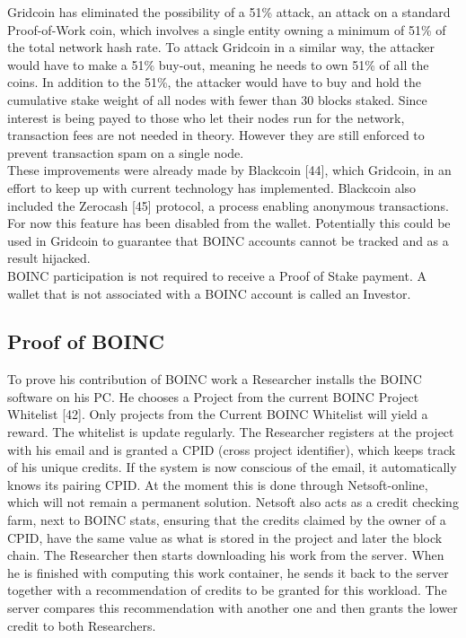 Gridcoin has eliminated the possibility of a 51\% attack, an attack on a standard Proof-of-Work coin, which involves a single entity owning a minimum of 51\% of the total network hash rate. To attack Gridcoin in a similar way, the attacker would have to make a 51\% buy-out, meaning he needs to own 51\% of all the coins. In addition to the 51\%, the attacker would have to buy and hold the cumulative stake weight of all nodes with fewer than 30 blocks staked. Since interest is being payed to those who let their nodes run for the network, transaction fees are not needed in theory. However they are still enforced to prevent transaction spam on a single node.\\

These improvements were already made by Blackcoin [44], which Gridcoin, in an effort to keep up with current technology has implemented. Blackcoin also included the Zerocash [45] protocol, a process enabling anonymous transactions. For now this feature has been disabled from the wallet. Potentially this could be used in Gridcoin to guarantee that BOINC accounts cannot be tracked and as a result hijacked.\\

BOINC participation is not required to receive a Proof of Stake payment. A wallet that is not associated with a BOINC account is called an Investor.

\subsection{Proof of BOINC}

To prove his contribution of BOINC work a Researcher installs the BOINC software on his PC. He chooses a Project from the current BOINC Project Whitelist [42]. Only projects from the Current BOINC Whitelist will yield a reward. The whitelist is update regularly. The Researcher registers at the project with his email and is granted a CPID (cross project identifier), which keeps track of his unique credits. If the system is now conscious of the email, it automatically knows its pairing CPID. At the moment this is done through Netsoft-online, which will not remain a permanent solution. Netsoft also acts as a credit checking farm, next to BOINC stats, ensuring that the credits claimed by the owner of a CPID, have the same value as what is stored in the project and later the block chain. The Researcher then starts downloading his work from the server. When he is finished with computing this work container, he sends it back to the server together with a recommendation of credits to be granted for this workload. The server compares this recommendation with another one and then grants the lower credit to both Researchers.\\

